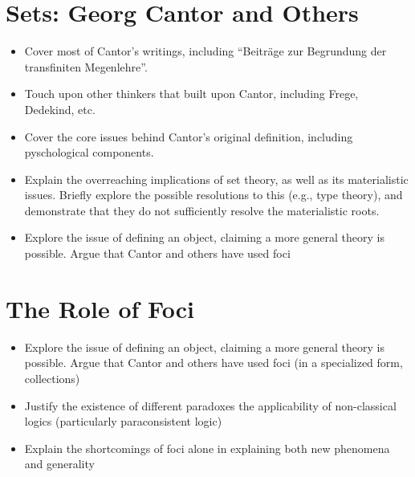 \section{Sets: Georg Cantor and Others}
\begin{itemize}
  \item Cover most of Cantor's writings, including ``Beiträge zur Begrundung der transfiniten Megenlehre''.
  \item Touch upon other thinkers that built upon Cantor, including Frege, Dedekind, etc.
  \item Cover the core issues behind Cantor's original definition, including pyschological components.
  \item Explain the overreaching implications of set theory, as well as its materialistic issues. Briefly explore the possible resolutions to this (e.g., type theory), and demonstrate that they do not sufficiently resolve the materialistic roots.
  \item Explore the issue of defining an object, claiming a more general theory is possible. Argue that Cantor and others have used foci
\end{itemize}


\section{The Role of Foci}
\begin{itemize}
  \item Explore the issue of defining an object, claiming a more general theory is possible. Argue that Cantor and others have used foci (in a specialized form, collections)
  \item Justify the existence of different paradoxes the applicability of non-classical logics (particularly paraconsistent logic)
  \item Explain the shortcomings of foci alone in explaining both new phenomena and generality
\end{itemize}

